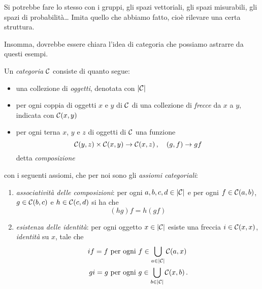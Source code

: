 \begin{esercizio}
Si potrebbe fare lo stesso con i gruppi, gli spazi vettoriali, gli spazi misurabili, gli spazi di probabilità\dots{} Imita quello che abbiamo fatto, cioè rilevare una certa struttura.  
\end{esercizio}

Insomma, dovrebbe essere chiara l'idea di categoria che possiamo astrarre da questi esempi.
%

\begin{definizione}[Categorie]\label{definizione:DefCat}
Un {\em categoria} \(\mathcal C\) consiste di quanto segue:
\begin{itemize}
\item una collezione di {\em oggetti}, denotata con \(\lvert\mathcal C\rvert\)
\item per ogni coppia di oggetti \(x\) e \(y\) di \(\mathcal C\) di una collezione di {\em frecce} da \(x\) a \(y\), indicata con \(\mathcal C(x,y)\)
\item per ogni terna \(x\), \(y\) e \(z\) di oggetti di \(\mathcal C\) una funzione
\[\mathcal C(y,z) \times \mathcal C(x,y) \to \mathcal C(x,z)\,, \quad (g,f) \to gf\]
detta {\em composizione}
\end{itemize}
con i seguenti assiomi, che per noi sono gli {\em assiomi categoriali}:
\begin{enumerate}%
\item {\em associatività delle composizioni}: per ogni \(a, b, c, d \in \lvert\mathcal C\rvert\) e per ogni \(f \in \mathcal C(a,b)\), \(g \in \mathcal C(b,c)\) e \(h \in \mathcal C(c,d)\) si ha che
\[(hg)f = h(gf)\]
\item {\em esistenza delle identità}: per ogni oggetto \(x \in \lvert\mathcal C\rvert\) esiste una freccia \(i \in \mathcal C(x,x)\), {\em identità } su \(x\), tale che
\begin{align*}
if=f &\text{ per ogni } f \in \bigcup_{a \in \lvert\mathcal C\rvert}\mathcal C(a,x) \\
gi=g &\text{ per ogni } g \in \bigcup_{b \in \lvert\mathcal C\rvert}\mathcal C(x,b) \,.
\end{align*}
\end{enumerate}
\end{definizione}

